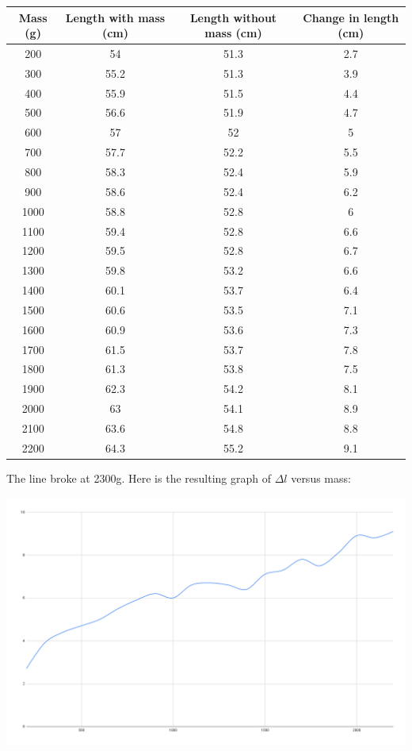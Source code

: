 \documentclass[12pt]{article}
\begin{document}
\begin{center}
\begin{tabular}{c|c|c|c}
Mass (g) & Length with mass (cm) & Length without mass (cm) & Change in length (cm)\\
\hline
200 & 54 & 51.3 & 2.7\\
300 & 55.2 & 51.3 & 3.9\\
400 & 55.9 & 51.5 & 4.4\\
500 & 56.6 & 51.9 & 4.7\\
600 & 57 & 52 & 5\\
700 & 57.7 & 52.2 & 5.5\\
800 & 58.3 & 52.4 & 5.9\\
900 & 58.6 & 52.4 & 6.2\\
1000 & 58.8 & 52.8 & 6\\
1100 & 59.4 & 52.8 & 6.6\\
1200 & 59.5 & 52.8 & 6.7\\
1300 & 59.8 & 53.2 & 6.6\\
1400 & 60.1 & 53.7 & 6.4\\
1500 & 60.6 & 53.5 & 7.1\\
1600 & 60.9 & 53.6 & 7.3\\
1700 & 61.5 & 53.7 & 7.8\\
1800 & 61.3 & 53.8 & 7.5\\
1900 & 62.3 & 54.2 & 8.1\\
2000 & 63 & 54.1 & 8.9\\
2100 & 63.6 & 54.8 & 8.8\\
2200 & 64.3 & 55.2 & 9.1\\
\end{tabular}
\end{center}

The line broke at 2300g. Here is the resulting graph of \(\Delta l\) versus mass:

\begin{center}
\includegraphics[width=6in]{./fourpoundchart.png}
\end{center}
\end{document}
